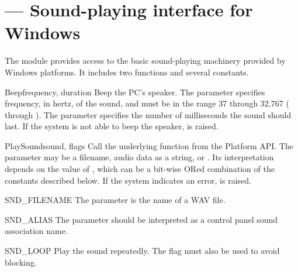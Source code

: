 \section{ ---
         Sound-playing interface for Windows}



The  module provides access to the basic
sound-playing machinery provided by Windows platforms.  It includes
two functions and several constants.


\begin{funcdesc}{Beep}{frequency, duration}
  Beep the PC's speaker.
  The  parameter specifies frequency, in hertz, of the
  sound, and must be in the range 37 through 32,767 (
  through ).  The  parameter specifies the
  number of milliseconds the sound should last.  If the system is not
  able to beep the speaker,  is raised.
\end{funcdesc}

\begin{funcdesc}{PlaySound}{sound, flags}
  Call the underlying  function from the
  Platform API.  The  parameter may be a filename, audio
  data as a string, or .  Its interpretation depends on the
  value of , which can be a bit-wise ORed combination of
  the constants described below.  If the system indicates an error,
   is raised.
\end{funcdesc}


\begin{datadesc}{SND_FILENAME}
  The  parameter is the name of a WAV file.
\end{datadesc}

\begin{datadesc}{SND_ALIAS}
  The  parameter should be interpreted as a control panel
  sound association name.
\end{datadesc}

\begin{datadesc}{SND_LOOP}
  Play the sound repeatedly.  The  flag must also
  be used to avoid blocking.
\end{datadesc}

